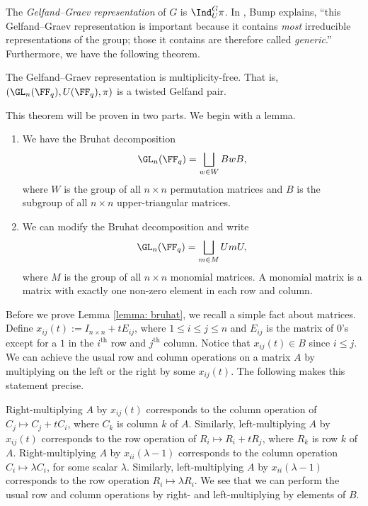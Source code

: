 The \emph{Gelfand--Graev representation} of $G$ is $\Ind_U^G \pi$.
In \cite{Bump13}, Bump explains, ``this Gelfand–Graev representation is important because it contains \emph{most} irreducible representations of the group; those it contains are therefore called \emph{generic}.'' Furthermore, we have the following theorem.
\begin{thm}\label{thm: gelf_graev}
    The Gelfand--Graev representation is multiplicity-free.
    That is, $(\GL_n(\FF_q),U(\FF_q),\pi)$ is a twisted Gelfand pair.
\end{thm}
This theorem will be proven in two parts.
We begin with a lemma.
\begin{lem}\label{lemma: bruhat}
    \begin{enumerate}[\itshape(i)]
        \item We have the Bruhat decomposition
              \[
                  \GL_n(\FF_q) = \bigsqcup_{w\in W} BwB,
              \]
              where $W$ is the group of all $n\times n$ permutation matrices and $B$ is the subgroup of all $n\times n$ upper-triangular matrices.
        \item We can modify the Bruhat decomposition and write
              \[
                  \GL_n(\FF_q) = \bigsqcup_{m\in M} UmU,
              \]
              where $M$ is the group of all $n\times n$ monomial matrices.
              A monomial matrix is a matrix with exactly one non-zero element in each row and column.
    \end{enumerate}
\end{lem}
Before we prove Lemma \ref{lemma: bruhat}, we recall a simple fact about matrices.
Define $x_{ij}(t) := I_{n\times n} + tE_{ij}$, where $1\leq i\leq j\leq n$ and $E_{ij}$ is the matrix of $0$'s except for a $1$ in the $i^\text{th}$ row and $j^\text{th}$ column.
Notice that $x_{ij}(t)\in B$ since $i\leq j$.
We can achieve the usual row and column operations on a matrix $A$ by multiplying on the left or the right by some $x_{ij}(t)$.
The following makes this statement precise.

Right-multiplying $A$ by $x_{ij}(t)$ corresponds to the column operation of $C_j\mapsto C_j+tC_i$, where $C_k$ is column $k$ of $A$.
Similarly, left-multiplying $A$ by $x_{ij}(t)$ corresponds to the row operation of $R_i \mapsto R_i+tR_j$, where $R_k$ is row $k$ of $A$.
Right-multiplying $A$ by $x_{ii}(\lambda-1)$ corresponds to the column operation $C_i\mapsto \lambda C_i$, for some scalar $\lambda$.
Similarly, left-multiplying $A$ by $x_{ii}(\lambda-1)$ corresponds to the row operation $R_i\mapsto\lambda R_i$.
We see that we can perform the usual row and column operations by right- and left-multiplying by elements of $B$.

